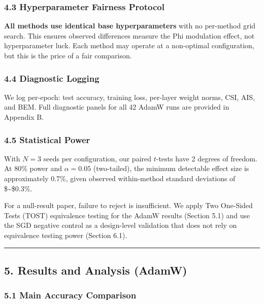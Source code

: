 \documentclass[
]{article}
\begin{document}
\hypertarget{hyperparameter-fairness-protocol}{%
\subsubsection{4.3 Hyperparameter Fairness
Protocol}\label{hyperparameter-fairness-protocol}}

\textbf{All methods use identical base hyperparameters} with no
per-method grid search. This ensures observed differences measure the
Phi modulation effect, not hyperparameter luck. Each method may operate
at a non-optimal configuration, but this is the price of a fair
comparison.

\hypertarget{diagnostic-logging}{%
\subsubsection{4.4 Diagnostic Logging}\label{diagnostic-logging}}

We log per-epoch: test accuracy, training loss, per-layer weight norms,
CSI, AIS, and BEM. Full diagnostic panels for all 42 AdamW runs are
provided in Appendix B.

\hypertarget{statistical-power}{%
\subsubsection{4.5 Statistical Power}\label{statistical-power}}

With \(N = 3\) seeds per configuration, our paired \(t\)-tests have 2
degrees of freedom. At 80\% power and \(\alpha = 0.05\) (two-tailed),
the minimum detectable effect size is approximately 0.7\%, given
observed within-method standard deviations of \$\sim\$0.3\%.

For a null-result paper, failure to reject is insufficient. We apply Two
One-Sided Tests (TOST) equivalence testing for the AdamW results
(Section 5.1) and use the SGD negative control as a design-level
validation that does not rely on equivalence testing power (Section
6.1).

\begin{center}\rule{0.5\linewidth}{0.5pt}\end{center}

\hypertarget{results-and-analysis-adamw}{%
\subsection{5. Results and Analysis
(AdamW)}\label{results-and-analysis-adamw}}

\hypertarget{main-accuracy-comparison}{%
\subsubsection{5.1 Main Accuracy
Comparison}\label{main-accuracy-comparison}}
\end{document}
